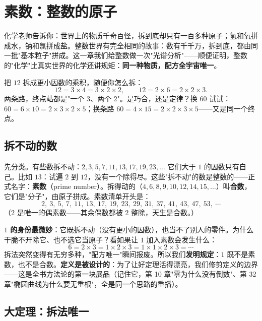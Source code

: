 \chapter{素数：整数的原子}

化学老师告诉你：世界上的物质千奇百怪，拆到底却只有一百多种原子；氢和氧拼成水，钠和氯拼成盐。整数世界有完全相同的故事：数有千千万，拆到底，都由同一批"基本粒子"拼成。这一章我们给整数做一次"光谱分析"——顺便证明，整数的"化学"比真实世界的化学还讲规矩：\textbf{同一种物质，配方全宇宙唯一}。

\begin{kaiwei}
把 $12$ 拆成更小因数的乘积，随便你怎么拆：
\[
12 = 3\times 4 = 3\times 2\times 2, \qquad
12 = 2\times 6 = 2\times 2\times 3 .
\]
两条路，终点站都是"一个 $3$、两个 $2$"。是巧合，还是定律？换 $60$ 试试：$60 = 6\times 10 = 2\times3\times2\times5$；换条路 $60 = 4 \times 15 = 2\times2\times3\times5$——又是同一个终点。
\end{kaiwei}

\section{拆不动的数}

先分类。有些数拆不动：$2, 3, 5, 7, 11, 13, 17, 19, 23, \dots$ 它们大于 $1$ 的因数只有自己。比如 $13$：试遍 $2$ 到 $12$，没有一个除得尽。这些"拆不动"的数是整数的——正式名字：\textbf{素数}（prime number）。拆得动的（$4, 6, 8, 9, 10, 12, 14, 15, \dots$）叫\textbf{合数}，它们是"分子"，由原子拼成。素数清单开头是：
\[
2,\ 3,\ 5,\ 7,\ 11,\ 13,\ 17,\ 19,\ 23,\ 29,\ 31,\ 37,\ 41,\ 43,\ 47,\ 53,\ \cdots
\]
（$2$ 是唯一的偶素数——其余偶数都被 $2$ 整除，天生是合数。）

\textbf{$1$ 的身份最微妙}：它既拆不动（没有更小的因数），也当不了别人的零件。为什么干脆不开除它、也不选它当原子？看如果让 $1$ 加入素数会发生什么：
\[
6 = 2\times 3 = 1\times 2\times 3 = 1\times 1\times 2\times 3 = \cdots
\]
拆法突然变得有无穷多种，"配方唯一"瞬间报废。所以我们\textbf{发明规定}：$1$ 既不是素数，也不是合数。\textbf{定义是被设计的}：为了让好定理活得漂亮，我们修剪定义的边界——这是全书方法论的第一块展品（记住它，第 10 章"零为什么没有倒数"、第 32 章"椭圆曲线为什么要无重根"，全是同一个思路的重播）。

\section{大定理：拆法唯一}

